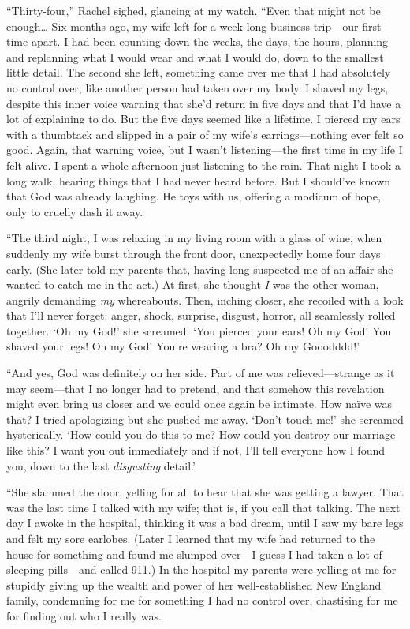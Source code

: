``Thirty-four,'' Rachel sighed, glancing at my watch. ``Even that might
not be enough\ldots{} Six months ago, my wife left for a week-long
business trip---our first time apart. I had been counting down the
weeks, the days, the hours, planning and replanning what I would wear
and what I would do, down to the smallest little detail. The second she
left, something came over me that I had absolutely no control over, like
another person had taken over my body. I shaved my legs, despite this
inner voice warning that she'd return in five days and that I'd have a
lot of explaining to do. But the five days seemed like a lifetime. I
pierced my ears with a thumbtack and slipped in a pair of my wife's
earrings---nothing ever felt so good. Again, that warning voice, but I
wasn't listening---the first time in my life I felt alive. I spent a
whole afternoon just listening to the rain. That night I took a long
walk, hearing things that I had never heard before. But I should've
known that God was already laughing. He toys with us, offering a modicum
of hope, only to cruelly dash it away.

``The third night, I was relaxing in my living room with a glass of
wine, when suddenly my wife burst through the front door, unexpectedly
home four days early. (She later told my parents that, having long
suspected me of an affair she wanted to catch me in the act.) At first,
she thought \emph{I} was the other woman, angrily demanding \emph{my}
whereabouts. Then, inching closer, she recoiled with a look that I'll
never forget: anger, shock, surprise, disgust, horror, all seamlessly
rolled together. `Oh my God!' she screamed. `You pierced your ears! Oh
my God! You shaved your legs! Oh my God! You're wearing a bra? Oh my
Gooodddd!'

``And yes, God was definitely on her side. Part of me was
relieved---strange as it may seem---that I no longer had to pretend, and
that somehow this revelation might even bring us closer and we could
once again be intimate. How naïve was that? I tried apologizing but she
pushed me away. `Don't touch me!' she screamed hysterically. `How could
you do this to me? How could you destroy our marriage like this? I want
you out immediately and if not, I'll tell everyone how I found you, down
to the last \emph{disgusting} detail.'

``She slammed the door, yelling for all to hear that she was getting a
lawyer. That was the last time I talked with my wife; that is, if you
call that talking. The next day I awoke in the hospital, thinking it was
a bad dream, until I saw my bare legs and felt my sore earlobes. (Later
I learned that my wife had returned to the house for something and found
me slumped over---I guess I had taken a lot of sleeping pills---and
called 911.) In the hospital my parents were yelling at me for stupidly
giving up the wealth and power of her well-established New England
family, condemning for me for something I had no control over,
chastising for me for finding out who I really was.

